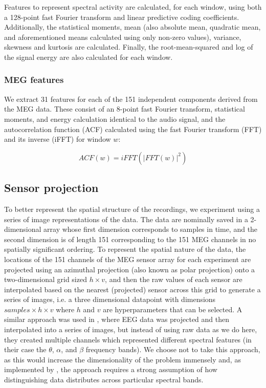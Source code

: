 \documentclass[utf8]{frontiersSCNS} %
\begin{document}
Features to represent spectral activity are calculated, for each window, using both a 128-point fast Fourier transform and linear predictive coding coefficients. Additionally, the statistical moments, mean (also absolute mean, quadratic mean, and aforementioned means calculated using only non-zero values), variance, skewness and kurtosis are calculated. Finally, the root-mean-squared and log of the signal energy are also calculated for each window.

\subsubsection{MEG features}

We extract 31 features for each of the 151 independent components derived from the MEG data. These consist of an 8-point fast Fourier transform, statistical moments, and energy calculation identical to the audio signal, and the autocorrelation function (ACF) calculated using the fast Fourier transform (FFT) and its inverse (iFFT) for window $w$:


\begin{equation}
  ACF(w) = iFFT(|FFT(w)|^2)
  \label{eq1}
\end{equation}

\subsection{Sensor projection}\label{sec:sens_proj}

To better represent the spatial structure of the recordings, we experiment using a series of image representations of the data. The data are nominally saved in a 2-dimensional array whose first dimension corresponds to samples in time, and the second dimension is of length 151 corresponding to the 151 MEG channels in no spatially significant ordering. To represent the spatial nature of the data, the locations of the 151 channels of the MEG sensor array for each experiment are projected using an azimuthal projection (also known as polar projection) onto a two-dimensional grid sized $h \times v$, and then the raw values of each sensor are  interpolated based on the nearest (projected) sensor across this grid to generate a series of images, i.e. a three dimensional datapoint with dimensions $samples \times  h \times v$ where $h$ and $v$ are hyperparameters that can be selected. A similar approach was used in \cite{Bashivan2016}, where EEG data was projected and then interpolated into a series of images, but instead of using raw data as we do here, they created multiple channels which represented different spectral features (in their case the $\theta$, $\alpha$, and $\beta$ frequency bands). We choose not to take this approach, as this would increase the dimensionality of the problem immensely and, as implemented by \cite{Bashivan2016}, the approach requires a strong assumption of how distinguishing data distributes across particular spectral bands.
\end{document}
